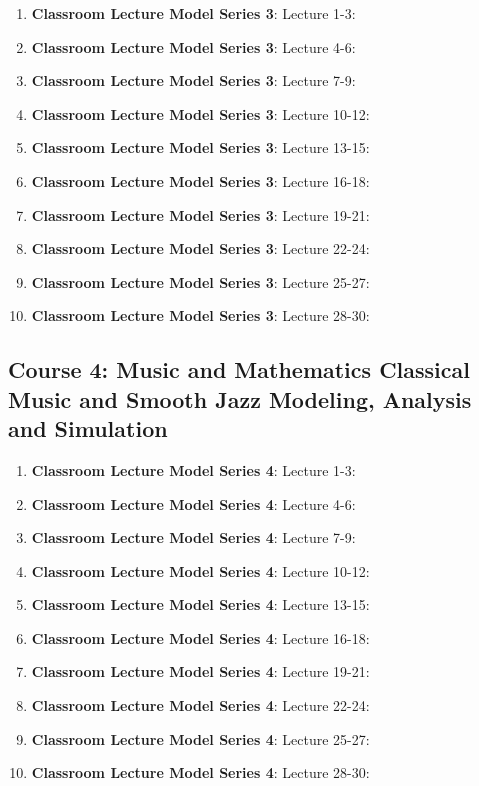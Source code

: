 \documentclass{ResumeDesignFormat1}
\begin{document}
\begin{enumerate}
\item \textbf{Classroom Lecture Model Series 3}: \textcolor{c3}{Lecture 1-3:}
\item \textbf{Classroom Lecture Model Series 3}: \textcolor{c3}{Lecture 4-6:}
\item \textbf{Classroom Lecture Model Series 3}: \textcolor{c3}{Lecture 7-9:}
\item \textbf{Classroom Lecture Model Series 3}: \textcolor{c3}{Lecture 10-12:}
\item \textbf{Classroom Lecture Model Series 3}: \textcolor{c3}{Lecture 13-15:}
\item \textbf{Classroom Lecture Model Series 3}: \textcolor{c3}{Lecture 16-18:}
\item \textbf{Classroom Lecture Model Series 3}: \textcolor{c3}{Lecture 19-21:}
\item \textbf{Classroom Lecture Model Series 3}: \textcolor{c3}{Lecture 22-24:}
\item \textbf{Classroom Lecture Model Series 3}: \textcolor{c3}{Lecture 25-27:}
\item \textbf{Classroom Lecture Model Series 3}: \textcolor{c3}{Lecture 28-30:}
\end{enumerate}

\subsection{Course 4: Music and Mathematics Classical Music and Smooth Jazz Modeling, Analysis and Simulation}

\begin{enumerate}
\item \textbf{Classroom Lecture Model Series 4}: \textcolor{c2}{Lecture 1-3:}
\item \textbf{Classroom Lecture Model Series 4}: \textcolor{c2}{Lecture 4-6:}
\item \textbf{Classroom Lecture Model Series 4}: \textcolor{c2}{Lecture 7-9:}
\item \textbf{Classroom Lecture Model Series 4}: \textcolor{c2}{Lecture 10-12:}
\item \textbf{Classroom Lecture Model Series 4}: \textcolor{c2}{Lecture 13-15:}
\item \textbf{Classroom Lecture Model Series 4}: \textcolor{c2}{Lecture 16-18:}
\item \textbf{Classroom Lecture Model Series 4}: \textcolor{c2}{Lecture 19-21:}
\item \textbf{Classroom Lecture Model Series 4}: \textcolor{c2}{Lecture 22-24:}
\item \textbf{Classroom Lecture Model Series 4}: \textcolor{c2}{Lecture 25-27:}
\item \textbf{Classroom Lecture Model Series 4}: \textcolor{c2}{Lecture 28-30:}
\end{enumerate}
\end{document}
